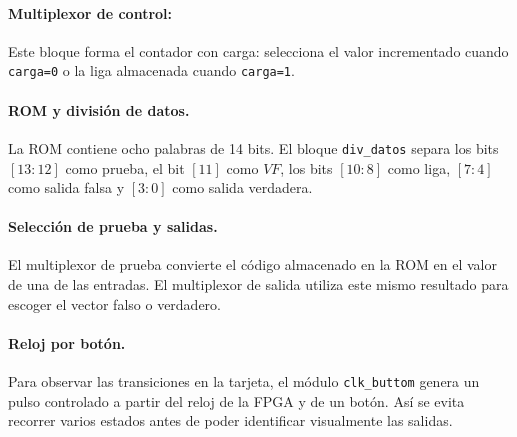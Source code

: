\documentclass[letterpaper,12pt]{article}
\begin{document}




\paragraph{Multiplexor de control:} Este bloque forma el contador con carga: selecciona el valor incrementado cuando \texttt{carga=0} o la liga almacenada cuando \texttt{carga=1}.



\paragraph{ROM y división de datos.} La ROM contiene ocho palabras de 14 bits. El bloque \texttt{div\_datos} separa los bits $[13:12]$ como prueba, el bit $[11]$ como $VF$, los bits $[10:8]$ como liga, $[7:4]$ como salida falsa y $[3:0]$ como salida verdadera.





\paragraph{Selección de prueba y salidas.} El multiplexor de prueba convierte el código almacenado en la ROM en el valor de una de las entradas. El multiplexor de salida utiliza este mismo resultado para escoger el vector falso o verdadero.





\paragraph{Reloj por botón.} Para observar las transiciones en la tarjeta, el módulo \texttt{clk\_buttom} genera un pulso controlado a partir del reloj de la FPGA y de un botón. Así se evita recorrer varios estados antes de poder identificar visualmente las salidas.
\end{document}
